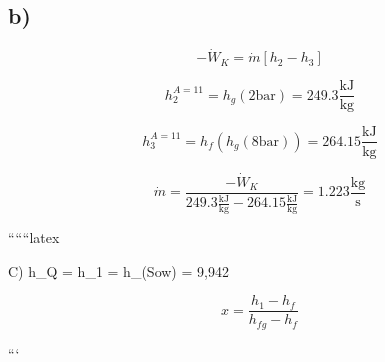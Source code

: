 

\subsection*{b)}

\[
-\dot{W}_K = \dot{m} \left[ h_2 - h_3 \right]
\]

\[
h_2^{A=11} = h_g \left( 2 \text{bar} \right) = 249.3 \frac{\text{kJ}}{\text{kg}}
\]

\[
h_3^{A=11} = h_f \left( h_g \left( 8 \text{bar} \right) \right) = 264.15 \frac{\text{kJ}}{\text{kg}}
\]

\[
\dot{m} = \frac{-\dot{W}_K}{249.3 \frac{\text{kJ}}{\text{kg}} - 264.15 \frac{\text{kJ}}{\text{kg}}} = 1.223 \frac{\text{kg}}{\text{s}}
\]

``````latex


C) \quad h_Q = h_1 = h_{(Sow)} = 9,942

\[
x = \frac{h_1 - h_f}{h_{fg} - h_f}
\]

```